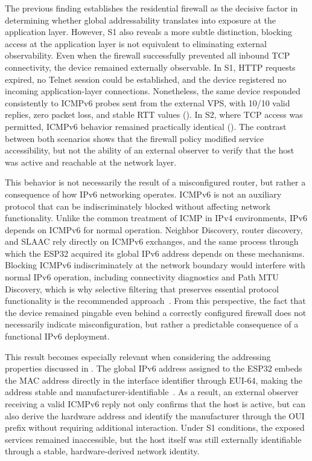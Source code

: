 The previous finding establishes the residential firewall as the decisive factor in determining whether global addressability translates into exposure at the application layer. However, S1 also reveals a more subtle distinction, blocking access at the application layer is not equivalent to eliminating external observability. Even when the firewall successfully prevented all inbound TCP connectivity, the device remained externally observable. In S1, HTTP requests expired, no Telnet session could be established, and the device registered no incoming application-layer connections. Nonetheless, the same device responded consistently to ICMPv6 probes sent from the external VPS, with 10/10 valid replies, zero packet loss, and stable RTT values (). In S2, where TCP access was permitted, ICMPv6 behavior remained practically identical (). The contrast between both scenarios shows that the firewall policy modified service accessibility, but not the ability of an external observer to verify that the host was active and reachable at the network layer.

This behavior is not necessarily the result of a misconfigured router, but rather a consequence of how IPv6 networking operates. ICMPv6 is not an auxiliary protocol that can be indiscriminately blocked without affecting network functionality. Unlike the common treatment of ICMP in IPv4 environments, IPv6 depends on ICMPv6 for normal operation. Neighbor Discovery, router discovery, and SLAAC rely directly on ICMPv6 exchanges, and the same process through which the ESP32 acquired its global IPv6 address depends on these mechanisms. Blocking ICMPv6 indiscriminately at the network boundary would interfere with normal IPv6 operation, including connectivity diagnostics and Path MTU Discovery, which is why selective filtering that preserves essential protocol functionality is the recommended approach~\cite{rfc4890}. From this perspective, the fact that the device remained pingable even behind a correctly configured firewall does not necessarily indicate misconfiguration, but rather a predictable consequence of a functional IPv6 deployment.

This result becomes especially relevant when considering the addressing properties discussed in . The global IPv6 address assigned to the ESP32 embeds the MAC address directly in the interface identifier through EUI-64, making the address stable and manufacturer-identifiable~\cite{rye2023ipvseeyou}. As a result, an external observer receiving a valid ICMPv6 reply not only confirms that the host is active, but can also derive the hardware address and identify the manufacturer through the OUI prefix without requiring additional interaction. Under S1 conditions, the exposed services remained inaccessible, but the host itself was still externally identifiable through a stable, hardware-derived network identity.

